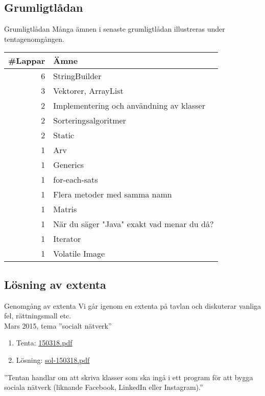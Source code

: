 \documentclass{lecturenotes}
\begin{document}
\subsection{Grumligtlådan}
\begin{Slide}{Grumligtlådan}\footnotesize
Många ämnen i senaste grumligtlådan illustreras under tentagenomgången.\\ \vspace{1em}
\begin{tabular}{r|l}
\#Lappar  & Ämne                         \\ \hline
6  & StringBuilder\\
3  & Vektorer, ArrayList\\
2  & Implementering och användning av klasser\\
2  & Sorteringsalgoritmer\\
2  & Static\\
1 & Arv\\
1  & Generics\\
1  & for-each-sats\\
1  & Flera metoder med samma namn\\
1  & Matris\\
1  & När du säger "Java" exakt vad menar du då?\\
1  & Iterator\\
1 & Volatile Image\\
\end{tabular}
\end{Slide}

\subsection{Lösning av extenta}
\begin{Slide}{Genomgång av extenta}
Vi går igenom en extenta på tavlan och diskuterar vanliga fel, rättningsmall etc.\\ \vspace{2em}
Mars 2015, tema ''socialt nätverk''
\begin{enumerate}
\item Tenta: \href{http://fileadmin.cs.lth.se/cs//Education/grundkurs/extentor/150318.pdf}{150318.pdf}
\item Lösning: \href{http://fileadmin.cs.lth.se/cs//Education/grundkurs/extentor/sol-150318.pdf}{sol-150318.pdf}
\end{enumerate}
\vspace{1em}
''Tentan handlar om att skriva klasser som ska ingå i ett program för att bygga sociala nätverk (liknande
Facebook, LinkedIn eller Instagram).''

\end{Slide}
\end{document}
